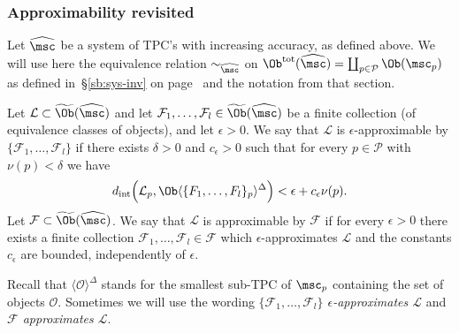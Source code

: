 \subsubsection{Approximability revisited} \label{s:approximability}

Let $\widehat{\msc}$ be a system of TPC's with increasing accuracy, as
defined above. We will use here the equivalence relation
  $\sim_{\widehat{\msc}}$ on
  $\Ob^{\text{tot}}(\widehat{\msc}) = \coprod_{p\in \mathcal{P}}
  \Ob(\msc_p)$ as defined in~\S\ref{sb:sys-inv} on
  page~\pageref{p:equiv-ob} and the notation from that section.
\begin{dfn} \label{d:approx-sys} Let
  $\mathcal{L} \subset \widetilde{\Ob}(\widehat{\msc})$ and let
  $\mathcal{F}_1, \ldots, \mathcal{F}_l \in
  \widetilde{\Ob}(\widehat{\msc})$ be a finite collection (of equivalence
  classes of objects), and let $\epsilon>0$. We say that $\mathcal{L}$
  is $\epsilon$-approximable by
  $\{\mathcal{F}_1, \ldots, \mathcal{F}_l\}$ if there exists
  $\delta>0$ and $c_{\epsilon}>0$ such that for every
  $p \in \mathcal{P}$ with $\nu(p) < \delta$ we have
  $${d}_{\text{int}} \Bigl(\mathcal{L}_p,
  \Ob \langle \{F_1, \ldots, F_l\}_p \rangle^{\Delta} \Bigr)
  < \epsilon + c_{\epsilon}\nu(p).$$
  Let $\mathcal{F} \subset \widetilde{\Ob}(\widehat{\msc})$. We say that
  $\mathcal{L}$ is approximable by $\mathcal{F}$ if for every
  $\epsilon>0$ there exists a finite collection
  $\mathcal{F}_1, \ldots, \mathcal{F}_l \in \mathcal{F}$ which
  $\epsilon$-approximates $\mathcal{L}$ and the constants $c_{\epsilon}$ 
  are bounded, independently of $\epsilon$.

  \end{dfn}
  Recall that 
  $\langle \mathcal{O} \rangle^{\Delta}$ stands for the
  smallest sub-TPC of $\msc_p$ containing the set of
  objects $\mathcal{O}$. Sometimes we will use the wording {\em
    $\{\mathcal{F}_1, \ldots, \mathcal{F}_l\}$ $\epsilon$-approximates
    $\mathcal{L}$} and {\em $\mathcal{F}$ approximates $\mathcal{L}$}.

\

